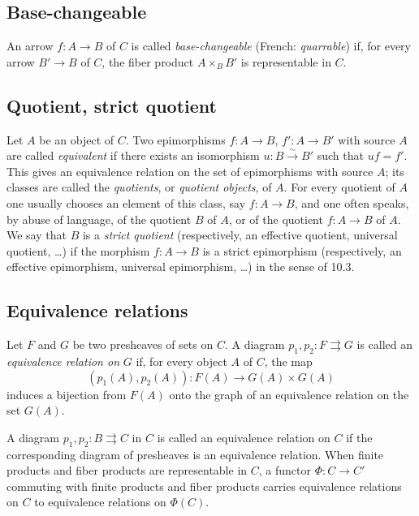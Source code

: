\documentclass[11pt]{article}
\newcommand{\xto}[1]{\xrightarrow{#1}}
\begin{document}
\subsection{Base-changeable}

An arrow \(f:A\to B\) of \(C\) is called \emph{base-changeable} (French: \emph{quarrable}) if, for every arrow \(B'\to B\) of \(C\), the fiber product \(A\times_B B'\) is representable in \(C\).

\subsection{Quotient, strict quotient}

Let \(A\) be an object of \(C\). Two epimorphisms \(f:A\to B\), \(f':A\to B'\) with source \(A\) are called \emph{equivalent} if there exists an isomorphism \(u:B\xto{\sim}B'\) such that \(uf=f'\). This gives an equivalence relation on the set of epimorphisms with source \(A\); its classes are called the \emph{quotients}, or \emph{quotient objects}, of \(A\). For every quotient of \(A\) one usually chooses an element of this class, say \(f:A\to B\), and one often speaks, by abuse of language, of the quotient \(B\) of \(A\), or of the quotient \(f:A\to B\) of \(A\). We say that \(B\) is a \emph{strict quotient} (respectively, an effective quotient, universal quotient, \ldots) if the morphism \(f:A\to B\) is a strict epimorphism (respectively, an effective epimorphism, universal epimorphism, \ldots) in the sense of 10.3.

\subsection{Equivalence relations}

Let \(F\) and \(G\) be two presheaves of sets on \(C\). A diagram \(p_1,p_2:F\rightrightarrows G\) is called an \emph{equivalence relation on} \(G\) if, for every object \(A\) of \(C\), the map
\[
 (p_1(A),p_2(A)):F(A)\longrightarrow G(A)\times G(A)
\]
induces a bijection from \(F(A)\) onto the graph of an equivalence relation on the set \(G(A)\).

A diagram \(p_1,p_2:B\rightrightarrows C\) in \(C\) is called an equivalence relation on \(C\) if the corresponding diagram of presheaves is an equivalence relation. When finite products and fiber products are representable in \(C\), a functor \(\Phi:C\to C'\) commuting with finite products and fiber products carries equivalence relations on \(C\) to equivalence relations on \(\Phi(C)\).
\end{document}
